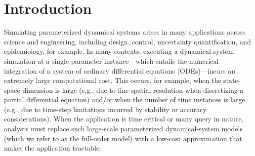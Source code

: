 \documentclass[3p,computermodern,10pt]{elsarticle}
\begin{document}
\begin{frontmatter}
\begin{abstract}

\end{abstract}
\end{frontmatter}


\section{Introduction}

Simulating parameterized dynamical systems arises in many applications across
science and engineering, including design, control, uncertainty
quantification, and epidemiology, for example. In many contexts, executing a dynamical-system
simulation at a single parameter instance---which entails the numerical
integration of a system of ordinary differential equations (ODEs)---incurs an
extremely large computational cost.  This occurs, for example, when the
state-space dimension is large (e.g., due to fine spatial resolution when
discretizing a partial differential equation) and/or when the number of time
instances is large (e.g., due to time-step limitations incurred by stability
or accuracy considerations).  When the application is time critical or many
query in nature, analysts must replace such large-scale parameterized
dynamical-system models (which we refer to as the full-order model) with a low-cost approximation that makes the
application tractable.
\end{document}
